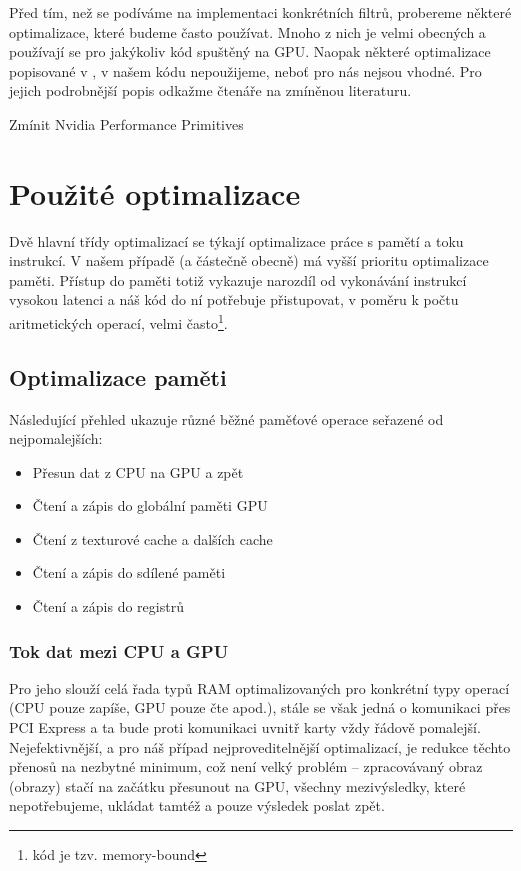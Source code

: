 
Před tím, než se podíváme na implementaci konkrétních filtrů, probereme některé optimalizace, které budeme často používat. Mnoho z nich je velmi obecných a používají se pro jakýkoliv kód spuštěný na GPU. Naopak některé optimalizace popisované v \cite{CUDA programming g.}, \cite{CUDA best practices} v našem kódu nepoužijeme, neboť pro nás nejsou vhodné. Pro jejich podrobnější popis odkažme čtenáře na zmíněnou literaturu.

Zmínit Nvidia Performance Primitives

\section{Použité optimalizace}
    
    Dvě hlavní třídy optimalizací se týkají optimalizace práce s pamětí a toku instrukcí. V našem případě (a částečně obecně) má vyšší prioritu optimalizace paměti. Přístup do paměti totiž vykazuje narozdíl od vykonávání instrukcí vysokou latenci a náš kód do ní potřebuje přistupovat, v poměru k počtu aritmetických operací, velmi často\footnote{kód je tzv. memory-bound}.
    
    \subsection{Optimalizace paměti}
    
        Následující přehled ukazuje různé běžné paměťové operace seřazené od nejpomalejších:
    \begin{itemize}
      \item Přesun dat z CPU na GPU a zpět
      \item Čtení a zápis do globální paměti GPU
      \item Čtení z texturové cache a dalších cache
      \item Čtení a zápis do sdílené paměti
      \item Čtení a zápis do registrů
    \end{itemize}
    
        \subsubsection{Tok dat mezi CPU a GPU}
        
        Pro jeho slouží celá řada typů RAM optimalizovaných pro konkrétní typy operací (CPU pouze zapíše, GPU pouze čte apod.), stále se však jedná o komunikaci přes PCI Express a ta bude proti komunikaci uvnitř karty vždy řádově pomalejší. Nejefektivnější, a pro náš případ nejproveditelnější optimalizací, je redukce těchto přenosů na nezbytné minimum, což není velký problém -- zpracovávaný obraz (obrazy) stačí na začátku přesunout na GPU, všechny mezivýsledky, které nepotřebujeme, ukládat tamtéž a pouze výsledek poslat zpět.
        
